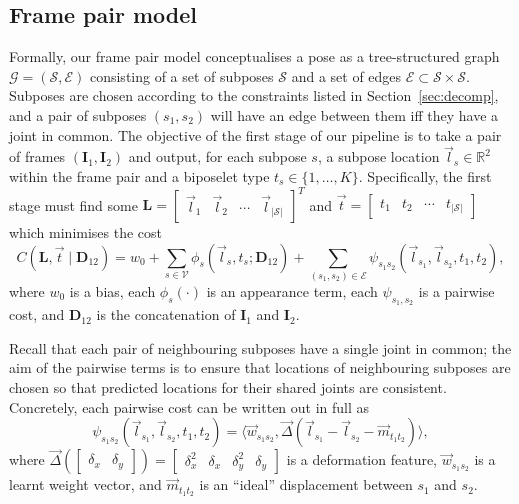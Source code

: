 \documentclass[runningheads]{llncs}
\newcommand{\mat}{\mathbf}
\begin{document}

\subsection{Frame pair model}

Formally, our frame pair model conceptualises a pose as a tree-structured graph
$\mathcal G = (\mathcal S, \mathcal E)$ consisting of a set of subposes
$\mathcal S$ and a set of edges $\mathcal E \subset \mathcal S \times \mathcal
S$. Subposes are chosen according to the constraints listed in
Section~\ref{sec:decomp}, and a pair of subposes $(s_1, s_2)$ will have an edge
between them iff they have a joint in common. The objective of the first stage
of our pipeline is to take a pair of frames $(\mat I_1, \mat I_2)$ and output,
for each subpose $s$, a subpose location $\vec l_s \in \mathbb R^2$ within the
frame pair and a biposelet type $t_s \in \{1, \ldots, K\}$. Specifically, the
first stage must find some $\mat L = \begin{bmatrix}\vec l_1 & \vec l_2 & \cdots
& \vec l_{|\mathcal S|}\end{bmatrix}^T$ and $\vec t = \begin{bmatrix}t_1 & t_2 &
\cdots & t_{|\mathcal S|}\end{bmatrix}$ which minimises the cost
%
\begin{equation}\label{eqn:full-cost}
C(\mat L, \vec t \mid \mat D_{12})
= w_0 + \sum_{s \in \mathcal V} \phi_s(\vec l_s, t_s; \mat D_{12})
+ \sum_{(s_1, s_2) \in \mathcal E}
    \psi_{s_1 s_2}(\vec l_{s_1}, \vec l_{s_2}, t_1, t_2),
\end{equation}
%
where $w_0$ is a bias, each $\phi_s(\cdot)$ is an appearance term, each
$\psi_{s_1,s_2}$ is a pairwise cost, and $\mat D_{12}$ is the concatenation
of $\mat I_1$ and $\mat I_2$.

Recall that each pair of neighbouring subposes have a single joint in common;
the aim of the pairwise terms is to ensure that locations of neighbouring
subposes are chosen so that predicted locations for their shared joints are
consistent. Concretely, each pairwise cost can be written out in full as
%
\begin{equation}\label{eqn:pair-cost}
\psi_{s_1 s_2}(\vec l_{s_1}, \vec l_{s_2}, t_1, t_2)
= \langle
    \vec w_{s_1 s_2},
    \vec \Delta(\vec l_{s_1} - \vec l_{s_2}  - \vec m_{t_1 t_2})
\rangle,
\end{equation}
%
where $\vec \Delta(\begin{bmatrix}\delta_x & \delta_y\end{bmatrix}) =
\begin{bmatrix}\delta_x^2 & \delta_x & \delta_y^2 & \delta_y\end{bmatrix}$ is a
deformation feature, $\vec w_{s_1 s_2}$ is a learnt weight vector, and
$\vec m_{t_1 t_2}$ is an ``ideal'' displacement between $s_1$ and $s_2$. %
\end{document}
